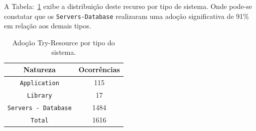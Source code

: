 A Tabela:~\ref{tab:adocaoResource} exibe a distribuição deste recurso por  tipo de sistema. Onde pode-se constatar que os \texttt{Servers-Database} realizaram uma adoção significativa de \num{91}\% em relação aos demais tipos.

\begin{table}[h]
	\centering
	\caption{Adoção Try-Resource por tipo do sistema.}
	\begin{tabular}{cc}
		\hline
		Natureza & Ocorrências \\ 
		\hline \hline
		\texttt{Application} & 115 \\ 
		\texttt{Library} & 17 \\ 
		\texttt{Servers - Database} & 1484 \\ \hline
		\texttt{Total} & 1616 \\ \hline
	\end{tabular}
	\label{tab:adocaoResource} %
\end{table}


